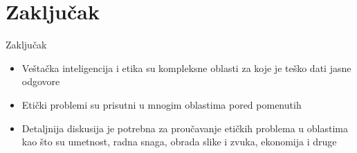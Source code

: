 \documentclass[14pt, aspectratio=169]{beamer}
\begin{document}
\section{Zaključak}

\begin{frame}{Zaključak}
    \begin{itemize}
    \item Veštačka inteligencija i etika su kompleksne oblasti za koje je teško dati jasne odgovore
    \item Etički problemi su prisutni u mnogim oblastima pored pomenutih
    \item Detaljnija diskusija je potrebna za proučavanje etičkih problema u oblastima kao što su umetnost, radna snaga, obrada slike i zvuka, ekonomija i druge
\end{itemize}
\end{frame}
\end{document}
